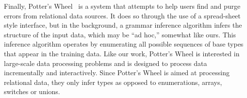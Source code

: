 Finally, Potter's Wheel~\cite{raman+:potterwheel} is a system that attempts to
help users find and purge errors from
relational data sources.  It does so through the use of a spread-sheet
style interface, but in the background, a grammar inference algorithm
infers the structure of the input data, which may be ``ad hoc,'' 
somewhat like ours.  This inference algorithm operates by
enumerating all possible sequences of base types that appear
in the training data.  Like our work, Potter's Wheel is interested
in large-scale data processing problems and is designed
to process data incrementally and interactively.
Since Potter's Wheel is aimed at processing
relational data, they only infer  types
as opposed to enumerations, arrays, switches or unions.  


